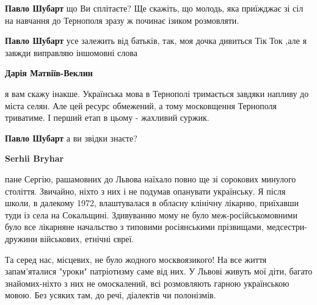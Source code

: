 \begin{itemize}
\begin{itemize}
\textbf{Павло Шубарт} що Ви сплітаєте? Ще скажіть, що молодь, яка приїжджає зі
сіл на навчання до Тернополя зразу ж починає ізиком розмовляти.

 
\textbf{Павло Шубарт} усе залежить від батьків, так, моя дочка дивиться Тік Ток ,але я завжди виправляю іншомовні слова

 
\textbf{Дарія Матвіїв-Веклин} 

я вам скажу інакше. Українська мова в Тернополі тримається завдяки напливу до
міста селян. Але цей ресурс обмежений, а тому московщення Тернополя триватиме.
І перший етап в цьому - жахливий суржик.


 
\textbf{Павло Шубарт} а ви звідки знаєте?

 
\textbf{Serhii Bryhar} 

пане Сергію, рашамовних до Львова наїхало повно ще зі сорокових минулого
століття. Звичайно, ніхто з них і не подумав опанувати українську. Я після
школи, в далекому 1972, влаштувалася в обласну клінічну лікарню, приїхавши туди
із села на Сокальщині. Здивуванню мому не було меж-російськомовними було все
лікарняне начальство з типовими росіянськими прізвищами, медсестри-дружини
військових, етнічні євреї. 

Та серед нас, місцевих, не було жодного москвоязикого! На все життя
запам'яталися "уроки" патріотизму саме від них. У Львові живуть мої діти,
багато знайомих-ніхто з них не омоскалений, всі розмовляють гарною українською
мовою. Без усяких там, до речі, діалектів чи полонізмів.



\end{itemize}
\end{itemize}
